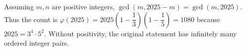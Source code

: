 Assuming $m,n$ are positive integers, $\gcd(m,2025-m)=\gcd(m,2025)$. Thus the count is $\varphi(2025)=2025(1-\dfrac{1}{3})(1-\dfrac{1}{5})=\boxed{1080}$ because $2025=3^4\cdot 5^2$. Without positivity, the original statement has infinitely many ordered integer pairs.
